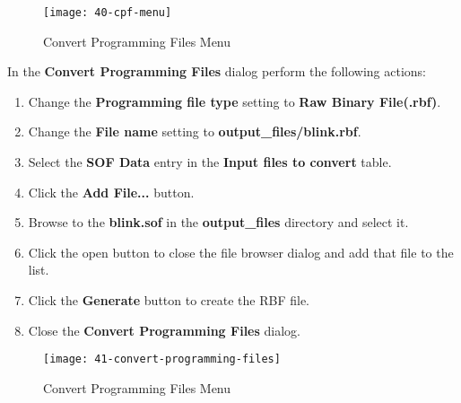 \begin{flushleft}
\begin{enumerate}[
	label=\textbf{Step \arabic*.},
	leftmargin=*,
	widest={00},
	align=left]
\begin{figure}[H]
\centering
\texttt{[image: 40-cpf-menu]}
\caption{Convert Programming Files Menu}
\label{fig:40-cpf-menu}
\end{figure}

\newpage

In the \textbf{Convert Programming Files} dialog perform the following actions:

\begin{enumerate}[
	label=\textbf{Step \arabic{enumi}\alph*.},
	leftmargin=*,
	align=left]

\item Change the \textbf{Programming file type} setting to \textbf{Raw Binary File(.rbf)}.

\item Change the \textbf{File name} setting to \textbf{output\_files/blink.rbf}.

\item Select the \textbf{SOF Data} entry in the \textbf{Input files to convert} table.

\item Click the \textbf{Add File...} button.

\item Browse to the \textbf{blink.sof} in the \textbf{output\_files} directory and select it.

\item Click the open button to close the file browser dialog and add that file to the list.

\item Click the \textbf{Generate} button to create the RBF file.

\item Close the \textbf{Convert Programming Files} dialog.

\end{enumerate}

\begin{figure}[H]
\centering
\texttt{[image: 41-convert-programming-files]}
\caption{Convert Programming Files Menu}
\label{fig:41-convert-programming-files}
\end{figure}


\end{enumerate}
\end{flushleft}
